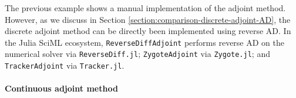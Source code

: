The previous example shows a manual implementation of the adjoint method. 
However, as we discuss in Section \ref{section:comparison-discrete-adjoint-AD}, the discrete adjoint method can be directly been implemented using reverse AD. 
In the Julia SciML ecosystem, \texttt{ReverseDiffAdjoint} performs reverse AD on the numerical solver via \texttt{ReverseDiff.jl}; \texttt{ZygoteAdjoint} via \texttt{Zygote.jl}; and \texttt{TrackerAdjoint} via \texttt{Tracker.jl}. 


\paragraph{Continuous adjoint method}

